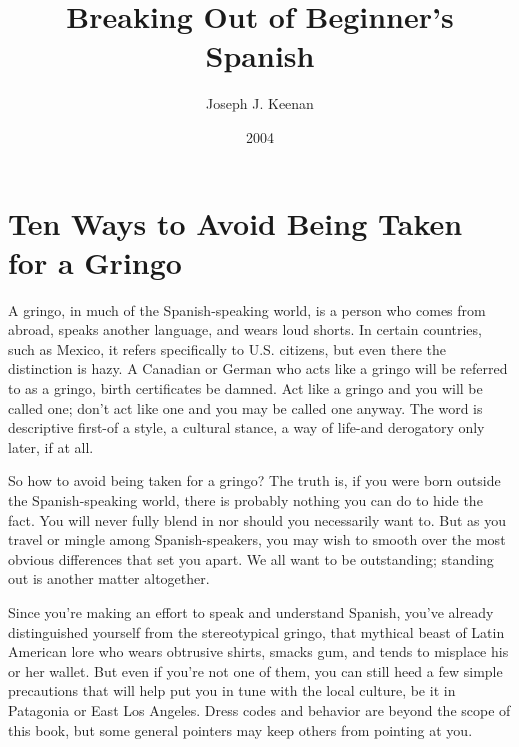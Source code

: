 \documentclass[14pt,a4paper,oneside]{memoir}
\begin{document}
\frontmatter

\begin{titlingpage}
	\title{Breaking Out of Beginner's Spanish}
	\posttitle{\par\vskip1em{\normalfont\normalsize\maltese\par}\end{center}}
	\author{Joseph J. Keenan}
	\date{2004}

	\maketitle
\end{titlingpage}

\tableofcontents*

\mainmatter

\chapter{Ten Ways to Avoid Being Taken for a Gringo}

A gringo, in much of the Spanish-speaking world, is a person
who comes from abroad, speaks another language, and wears loud
shorts. In certain countries, such as Mexico, it refers specifically to
U.S. citizens, but even there the distinction is hazy. A Canadian or
German who acts like a gringo will be referred to as a gringo, birth certificates be damned. Act like a gringo and you will be called one; don't
act like one and you may be called one anyway. The word is descriptive
first-of a style, a cultural stance, a way of life-and derogatory only
later, if at all.

So how to avoid being taken for a gringo? The truth is, if you
were born outside the Spanish-speaking world, there is probably nothing you can do to hide the fact. You will never fully blend in nor
should you necessarily want to. But as you travel or mingle among
Spanish-speakers, you may wish to smooth over the most obvious differences that set you apart. We all want to be outstanding; standing out
is another matter altogether.

Since you're making an effort to speak and understand Spanish, you've already distinguished yourself from the stereotypical
gringo, that mythical beast of Latin American lore who wears obtrusive shirts, smacks gum, and tends to misplace his or her wallet. But
even if you're not one of them, you can still heed a few simple precautions that will help put you in tune with the local culture, be it in Patagonia or East Los Angeles. Dress codes and behavior are beyond the
scope of this book, but some general pointers may keep others from
pointing at you.
\end{document}
